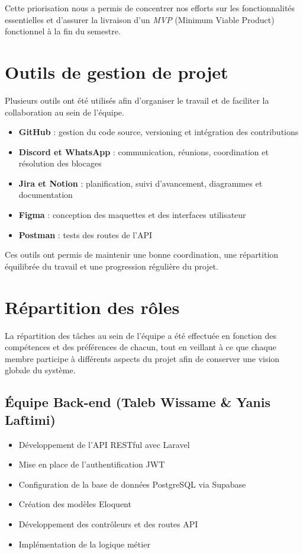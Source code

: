 \documentclass[12pt,a4paper]{report}
\begin{document}
Cette priorisation nous a permis de concentrer nos efforts sur les fonctionnalités essentielles et d’assurer la livraison d’un \textit{MVP} (Minimum Viable Product) fonctionnel à la fin du semestre.

\section{Outils de gestion de projet}

Plusieurs outils ont été utilisés afin d’organiser le travail et de faciliter la collaboration au sein de l’équipe.

\begin{itemize}
  \item \textbf{GitHub} : gestion du code source, versioning et intégration des contributions
  \item \textbf{Discord et WhatsApp} : communication, réunions, coordination et résolution des blocages
  \item \textbf{Jira et Notion} : planification, suivi d’avancement, diagrammes et documentation
  \item \textbf{Figma} : conception des maquettes et des interfaces utilisateur
  \item \textbf{Postman} : tests des routes de l’API
\end{itemize}

Ces outils ont permis de maintenir une bonne coordination, une répartition équilibrée du travail et une progression régulière du projet.

\section{Répartition des rôles}

La répartition des tâches au sein de l’équipe a été effectuée en fonction des compétences et des préférences de chacun, tout en veillant à ce que chaque membre participe à différents aspects du projet afin de conserver une vision globale du système.

\subsection*{Équipe Back-end (Taleb Wissame \& Yanis Laftimi)}
\begin{itemize}
  \item Développement de l’API RESTful avec Laravel
  \item Mise en place de l’authentification JWT
  \item Configuration de la base de données PostgreSQL via Supabase
  \item Création des modèles Eloquent
  \item Développement des contrôleurs et des routes API
  \item Implémentation de la logique métier
\end{itemize}
\end{document}
